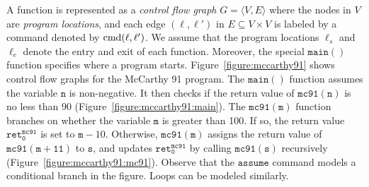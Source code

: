 A function is represented as a \emph{control flow graph} $G = \langle
V, E \rangle$ where the nodes in $V$ are \emph{program locations}, and
each edge $(\ell, \ell')$ in $E \subseteq V \times V$ is labeled by a
command denoted by $\textmd{cmd} (\ell, \ell')$. We
assume that the program locations $\ell_s$ and $\ell_e$ denote the
entry and exit of each function. Moreover, the special
$\mathtt{main()}$ function specifies where a program starts.
Figure~\ref{figure:mccarthy91} shows control flow graphs for the
McCarthy 91 program. The $\mathtt{main()}$ function assumes the
variable $\mathtt{n}$ is non-negative. It then checks if the return
value of $\mathtt{mc91(n)}$ is no less than 90
(Figure~\ref{figure:mccarthy91:main}). The $\mathtt{mc91(m)}$ function
branches on whether the variable $\mathtt{m}$ is greater than 100. If
so, the return value $\mathtt{ret^{mc91}_0}$ is set to $\mathtt{m} -
10$. Otherwise, 
$\mathtt{mc91(m)}$ assigns the return value of $\mathtt{mc91(m + 11)}$
to $\mathtt{s}$, and updates $\mathtt{ret^{mc91}_0}$ by calling
$\mathtt{mc91(s)}$ recursively
(Figure~\ref{figure:mccarthy91:mc91}). Observe that the 
$\mathtt{assume}$ command models a conditional branch in the
figure. Loops can be modeled similarly.


